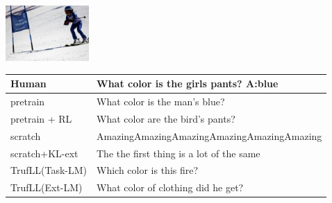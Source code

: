 \documentclass{article}
\newcommand{\algo}{TrufLL\xspace}
\begin{document}
\begin{table}[t!]
   \begin{minipage}{0.2\linewidth}
        \includegraphics[width=120px]{./COCO_val2014_000000275034.jpeg}
	\end{minipage}
	\hspace{1.2cm}
	\begin{minipage}{0.80\linewidth}
		\scriptsize
		\begin{tabular}{ll}
			Human           & What color is the girls pants?  \quad \textbf{A:blue} \\
			\midrule
			pretrain        & What color is the man's blue? \\
		    pretrain + RL   & What color are the bird's pants? \\ \midrule
			scratch         & AmazingAmazingAmazingAmazingAmazingAmazing \\
			scratch+KL-ext  & The the first thing is a lot of the same\\ \midrule
			\algo(Task-LM) & Which color is this fire? \\
			\algo(Ext-LM)   & What color of clothing did he get? \\
			\bottomrule
		\end{tabular}
	\end{minipage}
	\vspace{1mm}
	


\end{table}
\end{document}
